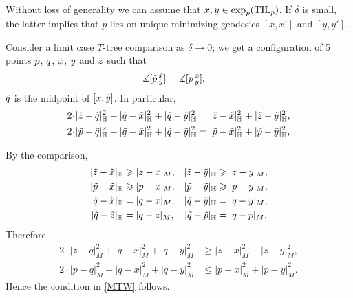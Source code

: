 Without loss of generality we can assume that $x,y\zz\in\exp_p(\TIL_p)$.
If $\delta$ is small, the latter implies that $p$ lies on unique minimizing geodesics $[x,x']$ and $[y,y']$.

Consider a limit case $T$-tree comparison as $\delta\to 0$;
we get a configuration of 5 points $\~p$, $\~q$, $\~x$, $\~y$ and $\~z$ such that
\begin{align*}
\measuredangle[\~p\,^{\~x}_{\~y}]&=\measuredangle[p\,^x_y],
\end{align*}
$\~q$ is the midpoint of $[\~x, \~y]$.
In particular,
\begin{align*}
2\cdot|\~z-\~q|_\HH^2+|\~q-\~x|_\HH^2+|\~q-\~y|_\HH^2
&=
|\~z-\~x|_\HH^2+|\~z-\~y|_\HH^2,
\\
2\cdot|\~p-\~q|_\HH^2+|\~q-\~x|_\HH^2+|\~q-\~y|_\HH^2
&=
|\~p-\~x|_\HH^2+|\~p-\~y|_\HH^2,
\end{align*}

By the comparison,
\begin{align*}
|\~z-\~x|_\HH&\ge |z-x|_M,
&
|\~z-\~y|_\HH&\ge |z-y|_M,
\\
|\~p-\~x|_\HH&\ge |p-x|_M,
&
|\~p-\~y|_\HH&\ge |p-y|_M,
\\
|\~q-\~x|_\HH&= |q-x|_M,
&
|\~q-\~y|_\HH&= |q-y|_M,
\\
|\~q-\~z|_\HH&= |q-z|_M,
&
|\~q-\~p|_\HH&= |q-p|_M,
\end{align*}
Therefore
\begin{align*}
2\cdot|z-q|_M^2+|q-x|_M^2+|q-y|_M^2
&\ge
|z-x|_M^2+|z-y|_M^2,
\\
2\cdot|p-q|_M^2+|q-x|_M^2+|q-y|_M^2
&\le
|p-x|_M^2+|p-y|_M^2.
\end{align*}
Hence the condition in \ref{MTW} follows.
\qeds


